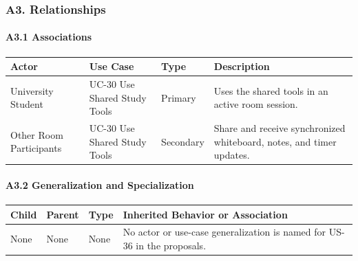 \documentclass[12pt]{article}
\renewcommand{\baselinestretch}{1.5}
\begin{document}
\subsubsection*{A3. Relationships}
\par\medskip

\hypertarget{sec:a3-1-associations}{}
\paragraph*{A3.1 Associations}
\par\medskip

\begingroup
\small
\renewcommand{\baselinestretch}{1.0}\selectfont
\renewcommand{\arraystretch}{1.15}
\setlength{\tabcolsep}{6pt}
\begin{longtable}{|>{\raggedright\arraybackslash}p{}|>{\raggedright\arraybackslash}p{}|>{\raggedright\arraybackslash}p{}|>{\raggedright\arraybackslash}p{}|}
\hline
\textbf{Actor} & \textbf{Use Case} & \textbf{Type} & \textbf{Description} \\ \hline
\endhead
University Student & UC-30 Use Shared Study Tools & Primary & Uses the shared tools in an active room session. \\ \hline
Other Room Participants & UC-30 Use Shared Study Tools & Secondary & Share and receive synchronized whiteboard, notes, and timer updates. \\ \hline
\end{longtable}
\endgroup
\par\medskip

\hypertarget{sec:a3-2-generalization-and-specialization}{}
\paragraph*{A3.2 Generalization and Specialization}
\par\medskip

\begingroup
\small
\renewcommand{\baselinestretch}{1.0}\selectfont
\renewcommand{\arraystretch}{1.15}
\setlength{\tabcolsep}{6pt}
\begin{longtable}{|>{\raggedright\arraybackslash}p{}|>{\raggedright\arraybackslash}p{}|>{\raggedright\arraybackslash}p{}|>{\raggedright\arraybackslash}p{}|}
\hline
\textbf{Child} & \textbf{Parent} & \textbf{Type} & \textbf{Inherited Behavior or Association} \\ \hline
\endhead
None & None & None & No actor or use-case generalization is named for US-36 in the proposals. \\ \hline
\end{longtable}
\endgroup
\par\medskip
\end{document}
